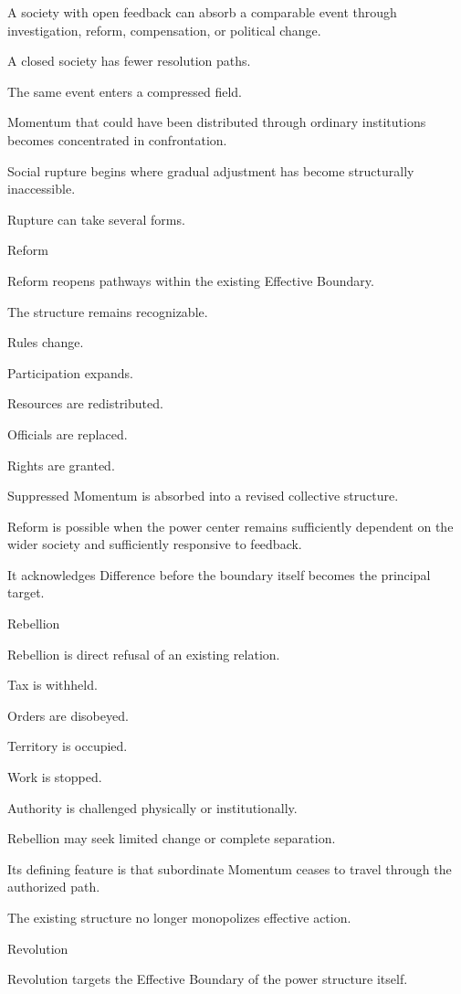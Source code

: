 A society with open feedback can absorb a comparable event through investigation, reform, compensation, or political change.

A closed society has fewer resolution paths.

The same event enters a compressed field.

Momentum that could have been distributed through ordinary institutions becomes concentrated in confrontation.

Social rupture begins where gradual adjustment has become structurally inaccessible.

Rupture can take several forms.

Reform

Reform reopens pathways within the existing Effective Boundary.

The structure remains recognizable.

Rules change.

Participation expands.

Resources are redistributed.

Officials are replaced.

Rights are granted.

Suppressed Momentum is absorbed into a revised collective structure.

Reform is possible when the power center remains sufficiently dependent on the wider society and sufficiently responsive to feedback.

It acknowledges Difference before the boundary itself becomes the principal target.

Rebellion

Rebellion is direct refusal of an existing relation.

Tax is withheld.

Orders are disobeyed.

Territory is occupied.

Work is stopped.

Authority is challenged physically or institutionally.

Rebellion may seek limited change or complete separation.

Its defining feature is that subordinate Momentum ceases to travel through the authorized path.

The existing structure no longer monopolizes effective action.

Revolution

Revolution targets the Effective Boundary of the power structure itself.

